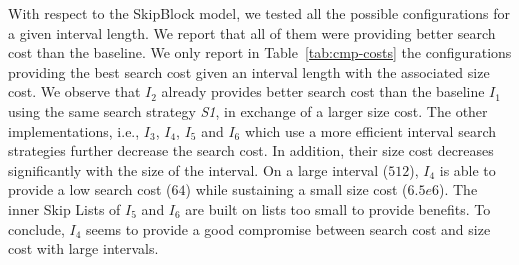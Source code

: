 With respect to the SkipBlock model, we tested all the possible
configurations for a given interval length. We report that all of them were
providing better search cost than the baseline. We only report in
Table~\ref{tab:cmp-costs} the configurations providing the best search cost
given an interval length with the associated size cost. We observe that $I_2$
already provides better search cost than the baseline $I_1$ using the same
search strategy \emph{S1}, in exchange of a larger size cost. The other
implementations, i.e., $I_3$, $I_4$, $I_5$ and $I_6$ which use a more
efficient interval search strategies further decrease the search cost. In
addition, their size cost decreases significantly with the size of the
interval. On a large interval ($512$), $I_4$ is able to provide a low search
cost ($64$) while sustaining a small size cost ($6.5e6$). The inner Skip
Lists of $I_5$ and $I_6$ are built on lists too small to provide benefits. To
conclude, $I_4$ seems to provide a good compromise between search cost and
size cost with large intervals.

\begin{table}
\centering
{}
%
\caption{Search (i.e., SC) and size (i.e., ZC, in million) costs with $n=10^8$.
SkipBlock implementations report the best search cost with the associated
size cost.}
\label{tab:cmp-costs}
\end{table}

